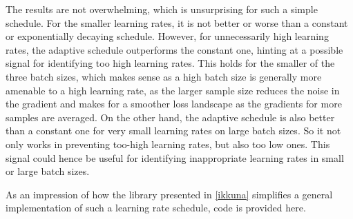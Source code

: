 The results are not overwhelming, which is unsurprising for such a
simple schedule. For the smaller learning rates, it is not better or worse than
a constant or exponentially decaying schedule. However, for unnecessarily high
learning rates, the adaptive schedule outperforms the constant one, hinting at a
possible signal for identifying too high learning rates. This holds for the
smaller of the three batch sizes, which makes sense as a high batch size is
generally more amenable to a high learning rate, as the larger sample size
reduces the noise in the gradient and makes for a smoother loss landscape as the
gradients for more samples are averaged. On the other hand, the adaptive schedule
is also better than a constant one for very small learning rates on large batch
sizes. So it not only works in preventing too-high learning rates, but also too
low ones. This signal could hence be useful for
identifying inappropriate learning rates in small or large batch sizes.

As an impression of how the library presented in \cref{ikkuna} simplifies a
general implementation of such a learning rate schedule, code is provided here.

